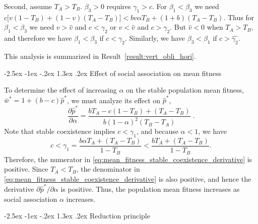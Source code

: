 \documentclass[12pt]{extarticle}
\makeatletter
\renewcommand\section{\@startsection {section}{1}{\z@}%
     {-2.5ex \@plus -1ex \@minus -.2ex}%
     {1.3ex \@plus.2ex}%
    {\Large\bfseries}}
\makeatother
\begin{document}
\begin{appendices}
Second, assume $T_A>T_B$.
$\beta_3>0$ requires $\gamma_1 > c$. 
For $\beta_1<\beta_3$ we need $c\big[v(1-T_B) + (1-v)(T_A-T_B)\big] < bv\alpha T_B + (1+b)(T_A-T_B)$.
Thus for $\beta_1<\beta_3$ we need $v > \hat v$ and $c < \gamma_2 $ or $v < \hat v$ and $c > \gamma_2$.
But $\hat{v}<0$ when $T_A > T_B$, and therefore we have $\beta_1<\beta_3$ if $c < \gamma_2$. Similarly, we have $\beta_3<\beta_1$ if $c > \hat{\gamma_2}$.

This analysis is summarized in Result~\ref{result:vert_obli_hori}.

\section{Effect of social association on mean fitness} \label{sec:appendixC}

To determine the effect of increasing $\alpha$ on the stable population mean fitness, $\bar{w}^*=1+(b-c)\hat{p}^*$, we must analyze its effect on $\hat{p}^*$, 
\begin{equation} \label{eq:mean_fitness_stable_coexistence_derivative}
  \frac{\partial \hat{p}^*}{\partial \alpha} 
  = \frac{b T_A - c(1-T_B) + (T_A-T_B)}{b (1-\alpha)^2 (T_B-T_A)} \;.
\end{equation} 
Note that stable coexistence implies $c<\gamma_1$, and because $\alpha<1$, we have
\begin{equation}
c < \gamma_1 = \frac{b \alpha T_A + (T_A-T_B)}{1-T_B} < \frac{b T_A + (T_A-T_B)}{1-T_B}.
\end{equation} 
Therefore, the numerator in \autoref{eq:mean_fitness_stable_coexistence_derivative} is positive.
Since $T_A<T_B$, the denominator in \autoref{eq:mean_fitness_stable_coexistence_derivative} is also positive, and hence the derivative $\partial \hat{p}^* / \partial \alpha$ is positive.
Thus, the population mean fitness increases as social association $\alpha$ increases.



\section{Reduction principle} \label{sec:appendixD}


\end{appendices}
\end{document}
